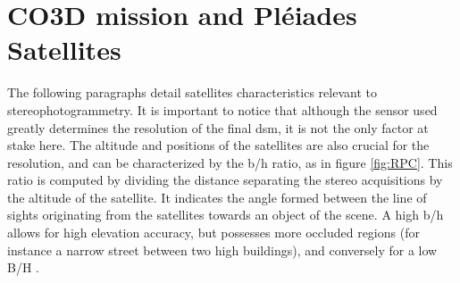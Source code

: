 \section{CO3D mission and Pléiades Satellites}\label{sec:co3d}
The following paragraphs detail satellites characteristics relevant to stereophotogrammetry. It is important to notice that although the sensor used greatly determines the resolution of the final \acrshort{dsm}, it is not the only factor at stake here. The altitude and positions of the satellites are also crucial for the resolution, and can be characterized by the \acrfull{b/h} ratio, as in figure \ref{fig:RPC}. This ratio is computed by dividing the distance separating the stereo acquisitions by the altitude of the satellite. It indicates the angle formed between the line of sights originating from the satellites towards an object of the scene. A high \acrshort{b/h} allows for high elevation accuracy, but possesses more occluded regions (for instance a narrow street between two high buildings), and conversely for a low B/H \cite{delon_small_2007}.

